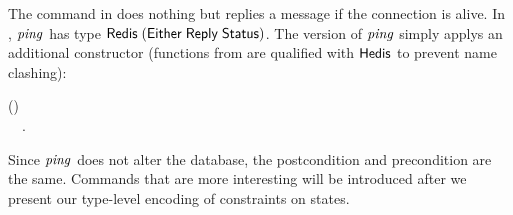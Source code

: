 The command  in \Redis{} does nothing but replies a message
 if the connection is alive. In \Hedis{}, \ensuremath{\Varid{ping}} has type
\ensuremath{\Conid{Redis}\;(\Conid{Either}\;\Conid{Reply}\;\Conid{Status})}. The \Popcorn{} version of \ensuremath{\Varid{ping}} simply
applys an additional constructor (functions from \Hedis{} are qualified with
\ensuremath{\Conid{Hedis}} to prevent name clashing):
\begin{hscode}\SaveRestoreHook
{}%
%
\>[B]{}\mathbin{::}\;\;\;(\;\;){}\<[E]%
\\
\>[B]{}\mathrel{=}\;~~.{}\<[E]%
\ColumnHook
\end{hscode}\resethooks
Since \ensuremath{\Varid{ping}} does not alter the database, the postcondition and precondition
are the same. Commands that are more interesting will be introduced after
we present our type-level encoding of constraints on states.
